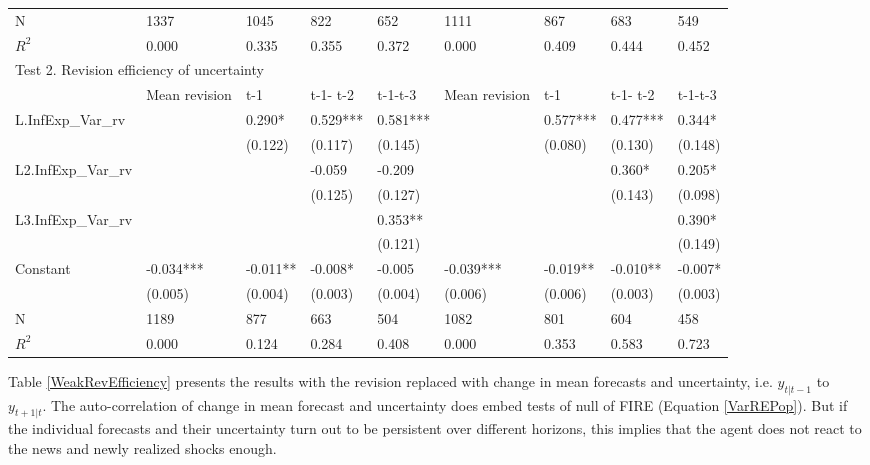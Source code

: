 \documentclass[]{article}
\begin{document}
\begin{table}[ht]
\begin{adjustbox}{angle=90}
\begin{tabular}{lllllllll}
				\hline 
				N                   & 1337          & 1045      & 822      & 652      & 1111          & 867       & 683       & 549       \\
				$R^2$                  & 0.000         & 0.335     & 0.355    & 0.372    & 0.000         & 0.409     & 0.444     & 0.452     \\
				\hline 
				\multicolumn{9}{l}{Test 2. Revision efficiency of uncertainty}                                                            \\
				\hline 
				& Mean revision & t-1       & t-1- t-2 & t-1-t-3  & Mean revision & t-1       & t-1- t-2  & t-1-t-3   \\
				\hline 
				L.InfExp\_Var\_rv   &               & 0.290*    & 0.529*** & 0.581*** &               & 0.577***  & 0.477***  & 0.344*    \\
				&               & (0.122)   & (0.117)  & (0.145)  &               & (0.080)   & (0.130)   & (0.148)   \\
				L2.InfExp\_Var\_rv  &               &           & -0.059   & -0.209   &               &           & 0.360*    & 0.205*    \\
				&               &           & (0.125)  & (0.127)  &               &           & (0.143)   & (0.098)   \\
				L3.InfExp\_Var\_rv  &               &           &          & 0.353**  &               &           &           & 0.390*    \\
				&               &           &          & (0.121)  &               &           &           & (0.149)   \\
				Constant              & -0.034***     & -0.011**  & -0.008*  & -0.005   & -0.039***     & -0.019**  & -0.010**  & -0.007*   \\
				& (0.005)       & (0.004)   & (0.003)  & (0.004)  & (0.006)       & (0.006)   & (0.003)   & (0.003)   \\
				\hline 
				N                   & 1189          & 877       & 663      & 504      & 1082          & 801       & 604       & 458       \\
				$R^2$                 & 0.000         & 0.124     & 0.284    & 0.408    & 0.000         & 0.353     & 0.583     & 0.723    \\
				\hline 
			\end{tabular}
		\end{adjustbox}
	\end{table}
	
	
	Table \ref{WeakRevEfficiency} presents the results with the revision replaced with change in mean forecasts and uncertainty, i.e. $y_{t|t-1}$ to $y_{t+1|t}$. The auto-correlation of change in mean forecast and uncertainty does embed  tests of null of FIRE (Equation \ref{VarREPop}). But if the individual forecasts and their uncertainty turn out to be persistent over different horizons, this implies that the agent does not react to the news and newly realized shocks enough. 
	
\end{document}
